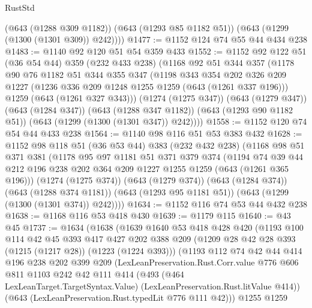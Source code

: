 \begin{lexlean}{RustStd}
\begin{coremodule}
        (@643 (@1288 @309 @1182))
        (@643 (@1293 @85 @1182 @51))
        (@643 (@1299 (@1300 (@1301 @309)) @242))))
@1477 := @1152 @124 @74 @55 @44 @434 @238
@1483 := @1140 @92 @120 @51 @54 @359 @433
@1552 := @1152
    @92
    @122
    @51
    (@36 @54 @44)
    @359
    (@232 @433 @238)
    (@1168
      @92
      @51
      @344
      @357
      (@1178
        @90
        @76
        @1182
        @51
        @344
        @355
        @347
        (@1198
          @343
          @354
          @202
          @326
          @209
          @1227
          (@1236 @336 @209 @1248 @1255 @1259 (@643 (@1261 @337 @196)))
          @1259
          (@643 (@1261 @327 @343)))
        (@1274 (@1275 @347))
        (@643 (@1279 @347))
        (@643 (@1284 @347))
        (@643 (@1288 @347 @1182))
        (@643 (@1293 @90 @1182 @51))
        (@643 (@1299 (@1300 (@1301 @347)) @242))))
@1558 := @1152 @120 @74 @54 @44 @433 @238
@1564 := @1140 @98 @116 @51 @53 @383 @432
@1628 := @1152
    @98
    @118
    @51
    (@36 @53 @44)
    @383
    (@232 @432 @238)
    (@1168
      @98
      @51
      @371
      @381
      (@1178
        @95
        @97
        @1181
        @51
        @371
        @379
        @374
        (@1194 @74 @39 @44 @212 @196 @238 @202 @364 @209 @1227 @1255 @1259 (@643 (@1261 @365 @196)))
        (@1274 (@1275 @374))
        (@643 (@1279 @374))
        (@643 (@1284 @374))
        (@643 (@1288 @374 @1181))
        (@643 (@1293 @95 @1181 @51))
        (@643 (@1299 (@1300 (@1301 @374)) @242))))
@1634 := @1152 @116 @74 @53 @44 @432 @238
@1638 := @1168 @116 @53 @418 @430
@1639 := @1179 @115
@1640 := @43 @45
@1737 := @1634
    (@1638
      (@1639
        @1640
        @53
        @418
        @428
        @420
        (@1193
          @100
          @114
          @42
          @45
          @393
          @417
          @427
          @202
          @388
          @209
          (@1209 @28 @42 @28 @393 (@1215 (@1217 @28)) (@1223 (@1224 @393)))
          (@1193
            @112
            @74
            @42
            @44
            @414
            @196
            @238
            @202
            @399
            @209
            (LexLeanPreservation.Rust.Corr.value
              @776
              @606
              @811
              @1103
              @242
              @42
              @111
              @414
              (@493
                (@464 LexLeanTarget.TargetSyntax.Value)
                (LexLeanPreservation.Rust.litValue @414))
              (@643 (LexLeanPreservation.Rust.typedLit @776 @111 @42)))
            @1255
            @1259

\end{coremodule}
\end{lexlean}
